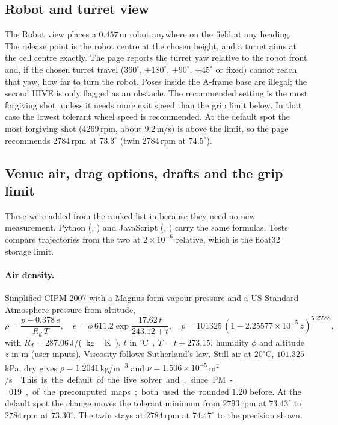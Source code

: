 \subsection{Robot and turret view}
\label{sec:field-robot}

The Robot view places a $0.457$\,\unit{m}\confirmed{} robot anywhere on the field at any heading. The
release point is the robot centre at the chosen height\assumed, and a turret aims at the cell centre
exactly\assumed. The page reports the turret yaw relative to the robot front and, if the chosen turret
travel ($360^\circ$, $\pm180^\circ$, $\pm90^\circ$, $\pm45^\circ$ or fixed) cannot reach that yaw, how far
to turn the robot. Poses inside the A-frame base are illegal; the second HIVE is only flagged as an
obstacle. The recommended setting is the most forgiving shot, unless it needs more exit speed than the
grip limit below. In that case the lowest tolerant wheel speed is recommended. At the default spot the most forgiving
shot ($4269$\,rpm, about $9.2$\,\unit{m/s}\predicted) is above the limit, so the page recommends
$2784$\,rpm at $73.3^\circ$\predicted{} (twin $2784$\,rpm at $74.5^\circ$\predicted).

\subsection{Venue air, drag options, drafts and the grip limit}
\label{sec:field-options}

These were added from the ranked list in  because they need no new
measurement. Python (, ) and JavaScript (,
) carry the same formulas. Tests compare trajectories from the two at
$2\times10^{-6}$ relative, which is the float32 storage limit.

\paragraph{Air density.} Simplified CIPM-2007 with a Magnus-form vapour pressure and a US Standard
Atmosphere pressure from altitude,
\begin{equation}
  \rho=\frac{p-0.378\,e}{R_d\,T},\quad e=\phi\,611.2\exp\frac{17.62\,t}{243.12+t},\quad
  p=101325\,(1-2.25577\times10^{-5}\,z)^{5.25588},
  \label{eq:field-rho}
\end{equation}
with $R_d=287.06$\,\unit{J/(kg\,K)}, $t$ in \unit{$^\circ$C}, $T=t+273.15$, humidity $\phi$ and altitude
$z$ in \unit{m} (user inputs). Viscosity follows Sutherland's law. Still air at $20^\circ$C,
$101.325$\,\unit{kPa}, dry gives $\rho=1.2041$\,\unit{kg/m\textsuperscript{3}}\derived{} and
$\nu=1.506\times10^{-5}$\,\unit{m$^2$/s}\derived. This is the default of the live solver and, since
PM-019, of the precomputed maps; both used the rounded $1.20$\assumed{} before. At the default spot the
change moves the tolerant
minimum from $2793$\,rpm at $73.43^\circ$ to $2784$\,rpm at $73.30^\circ$\predicted. The twin stays at
$2784$\,rpm at $74.47^\circ$\predicted{} to the precision shown.


